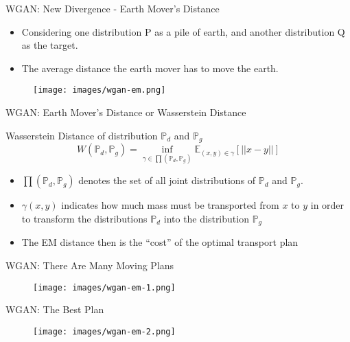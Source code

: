 \documentclass[handout]{beamer}
\begin{document}
\begin{frame}[<+->]{WGAN: New Divergence - Earth Mover’s Distance}
	\begin{itemize}
		\item Considering one distribution P as a pile of earth, and another distribution Q as the target.
		\item The average distance the earth mover has to move the earth.
	\end{itemize}
	\begin{actionenv}
		\begin{figure}
			\centering
			\texttt{[image: images/wgan-em.png]}
		\end{figure}
	\end{actionenv}
\end{frame}

\begin{frame}[<+->]{WGAN: Earth Mover’s Distance or Wasserstein Distance}
	\begin{definition}
		Wasserstein Distance of distribution $\mathbb{P}_d$ and $\mathbb{P}_g$
		$$W(\mathbb{P}_d, \mathbb{P}_g) = \inf_{\gamma \in \prod(\mathbb{P}_d, \mathbb{P}_g)}
		\mathbb{E}_{(x, y) \in \gamma}[||x - y||]$$
		\begin{itemize}
			\item $\prod(\mathbb{P}_d, \mathbb{P}_g)$ denotes the set of all joint distributions of $\mathbb{P}_d$ and $\mathbb{P}_g$.
			\item $\gamma(x, y)$ indicates how much mass must be transported from $x$ to $y$ in order to transform the distributions $\mathbb{P}_d$ into the distribution $\mathbb{P}_g$
			\item The EM distance then is the “cost” of the optimal transport plan
		\end{itemize}
	\end{definition}
\end{frame}

\begin{frame}{WGAN: There Are Many Moving Plans}
	\begin{figure}
		\centering
		\texttt{[image: images/wgan-em-1.png]}
	\end{figure}
\end{frame}

\begin{frame}{WGAN: The Best Plan}
	\begin{figure}
		\centering
		\texttt{[image: images/wgan-em-2.png]}
	\end{figure}
\end{frame}
\end{document}
